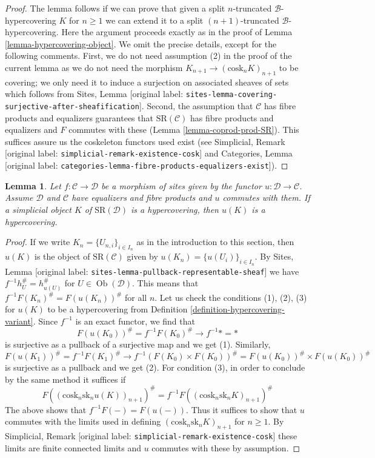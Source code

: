 \documentclass[10pt,a4paper]{article}
\theoremstyle{plain}
\newtheorem{lemma}[subsection]{Lemma}
\theoremstyle{definition}
\theoremstyle{remark}
\numberwithin{equation}{subsection}
\def\Ob{\mathop{\mathrm{Ob}}\nolimits}
\begin{document}
\begin{proof}
\medskip\noindent
The lemma follows if we can prove that given a split
$n$-truncated $\mathcal{B}$-hypercovering $K$ for $n \geq 1$
we can extend it to a split $(n + 1)$-truncated $\mathcal{B}$-hypercovering.
Here the argument proceeds exactly as in the proof of
Lemma \ref{lemma-hypercovering-object}.
We omit the precise details, except for the following comments.
First, we do not need assumption (2) in the proof of the current
lemma as we do not need the morphism
$K_{n + 1} \to (\text{cosk}_n K)_{n + 1}$ to be covering;
we only need it to induce a surjection on associated sheaves of sets
which follows from
Sites, Lemma \textnormal{[original label: \nolinkurl{sites-lemma-covering-surjective-after-sheafification}]}.
Second, the assumption that $\mathcal{C}$ has fibre products and equalizers
guarantees that $\text{SR}(\mathcal{C})$ has fibre products
and equalizers and $F$ commutes with these
(Lemma \ref{lemma-coprod-prod-SR}). This suffices
assure us the coskeleton functors used exist (see
Simplicial, Remark \textnormal{[original label: \nolinkurl{simplicial-remark-existence-cosk}]} and
Categories, Lemma \textnormal{[original label: \nolinkurl{categories-lemma-fibre-products-equalizers-exist}]}).
\end{proof}

\begin{lemma}
\label{lemma-hypercovering-morphism-sites}
Let $f : \mathcal{C} \to \mathcal{D}$ be a morphism of sites
given by the functor $u : \mathcal{D} \to \mathcal{C}$.
Assume $\mathcal{D}$ and $\mathcal{C}$ have equalizers and
fibre products and $u$ commutes with them.
If a simplicial object $K$ of $\text{SR}(\mathcal{D})$
is a hypercovering, then $u(K)$ is a hypercovering.
\end{lemma}

\begin{proof}
If we write $K_n = \{U_{n, i}\}_{i \in I_n}$ as in the introduction
to this section, then $u(K)$ is the object of $\text{SR}(\mathcal{C})$
given by $u(K_n) = \{u(U_i)\}_{i \in I_n}$.
By Sites, Lemma \textnormal{[original label: \nolinkurl{sites-lemma-pullback-representable-sheaf}]}
we have $f^{-1}h_U^\# = h_{u(U)}^\#$ for $U \in \Ob(\mathcal{D})$.
This means that $f^{-1}F(K_n)^\# = F(u(K_n))^\#$ for all $n$.
Let us check the conditions (1), (2), (3) for $u(K)$ to be a
hypercovering from Definition \ref{definition-hypercovering-variant}.
Since $f^{-1}$ is an exact functor, we find that
$$
F(u(K_0))^\# = f^{-1}F(K_0)^\# \to f^{-1}* = *
$$
is surjective as a pullback of a surjective map and we get (1).
Similarly,
$$
F(u(K_1))^\# = f^{-1}F(K_1)^\# \to
f^{-1} (F(K_0) \times F(K_0))^\# = F(u(K_0))^\# \times F(u(K_0))^\#
$$
is surjective as a pullback and we get (2). For condition (3),
in order to conclude by the same method it suffices if
$$
F((\text{cosk}_n \text{sk}_n u(K))_{n + 1})^\# =
f^{-1}F((\text{cosk}_n \text{sk}_n K)_{n + 1})^\#
$$
The above shows that $f^{-1}F(-) = F(u(-))$. Thus it suffices to show
that $u$ commutes with the limits used in defining
$(\text{cosk}_n \text{sk}_n K)_{n + 1}$ for $n \geq 1$.
By Simplicial, Remark \textnormal{[original label: \nolinkurl{simplicial-remark-existence-cosk}]}
these limits are finite connected limits and $u$ commutes with these
by assumption.
\end{proof}
\end{document}
